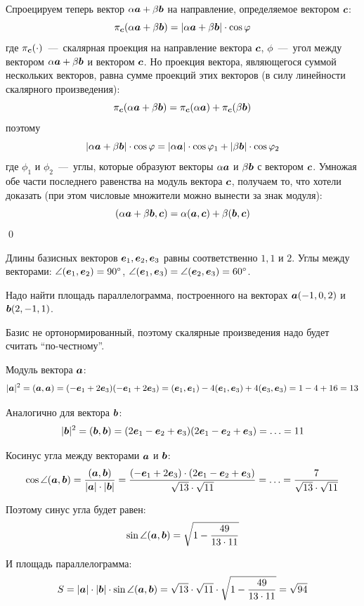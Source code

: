 \documentclass[a4paper,12pt]{article}
\begin{document}
  Спроецируем теперь вектор $\alpha \bds a \hm+ \beta \bds b$ на направление, определяемое вектором $\boldsymbol c$:
  \[
    \pi_{\boldsymbol c}(\alpha \boldsymbol a + \beta \boldsymbol b) = |\alpha \boldsymbol a + \beta \boldsymbol b| \cdot \cos \varphi
  \]
  где $\pi_{\boldsymbol c}(\cdot)$~---~скалярная проекция на направление вектора $\boldsymbol c$,
  $\phi$~---~угол между вектором $\alpha \bds a \hm+ \beta \bds b$ и вектором $\boldsymbol c$.
  Но проекция вектора, являющегося суммой нескольких векторов, равна сумме проекций этих векторов (в силу линейности скалярного произведения):
  \[
    \pi_{\boldsymbol c}(\alpha \boldsymbol a + \beta \boldsymbol b) = \pi_{\boldsymbol c}(\alpha \boldsymbol a) + \pi_{\boldsymbol c}(\beta \boldsymbol b)
  \]
  поэтому
  \[
    |\alpha \boldsymbol a + \beta \boldsymbol b| \cdot \cos \varphi = |\alpha \boldsymbol a| \cdot \cos \varphi_1 + |\beta \boldsymbol b| \cdot \cos \varphi_2
  \]
  где $\phi_1$ и $\phi_2$~---~углы, которые образуют векторы $\alpha \boldsymbol a$ и $\beta \boldsymbol b$ с вектором $\boldsymbol c$.
  Умножая обе части последнего равенства на модуль вектора $\boldsymbol c$, получаем то, что хотели доказать (при этом числовые множители можно вынести за знак модуля):
  \[
    (\alpha \boldsymbol a + \beta \boldsymbol b, \boldsymbol c) = \alpha (\boldsymbol a, \boldsymbol c) + \beta (\boldsymbol b, \boldsymbol c)
  \]
  \qed
  
  
  \begin{problem}[2.22]
    Длины базисных векторов $\boldsymbol e_1, \boldsymbol e_2, \boldsymbol e_3$ равны соответственно $1, 1$ и $2$.
    Углы между векторами: $\angle (\bds e_1, \bds e_2) \hm= 90\degree$, $\angle (\bds e_1, \bds e_3) \hm= \angle (\bds e_2, \bds e_3) \hm= 60\degree$.
    
    Надо найти площадь параллелограмма, построенного на векторах $\boldsymbol a (-1, 0, 2)$ и $\boldsymbol b (2, -1, 1)$.
  \end{problem}
  
  \begin{solution}
    Базис не ортонормированный, поэтому скалярные произведения надо будет считать ``по-честному''.
    
    Модуль вектора $\boldsymbol a$:
    \[
      |\boldsymbol a|^2 = (\boldsymbol a, \boldsymbol a) = (-\boldsymbol e_1 + 2\boldsymbol e_3)(-\boldsymbol e_1 + 2\boldsymbol e_3)
        = (\boldsymbol e_1, \boldsymbol e_1) - 4 (\boldsymbol e_1, \boldsymbol e_3) + 4 (\boldsymbol e_3, \boldsymbol e_3)
        = 1 - 4 + 16 = 13
    \]
    
    Аналогично для вектора $\boldsymbol b$:
    \[
      |\boldsymbol b|^2 = (\boldsymbol b, \boldsymbol b) = (2\boldsymbol e_1 - \boldsymbol e_2 + \boldsymbol e_3)(2\boldsymbol e_1 - \boldsymbol e_2 + \boldsymbol e_3)
        = \ldots = 11
    \]
    
    Косинус угла между векторами $\boldsymbol a$ и $\boldsymbol b$:
    \[
      \cos\angle(\boldsymbol a, \boldsymbol b) = \frac{(\boldsymbol a, \boldsymbol b)}{|\boldsymbol a| \cdot |\boldsymbol b|}
        = \frac{(-\boldsymbol e_1 + 2\boldsymbol e_3) \cdot (2\boldsymbol e_1 - \boldsymbol e_2 + \boldsymbol e_3)}{\sqrt{13} \cdot \sqrt{11}}
        = \ldots = \frac{7}{\sqrt{13} \cdot \sqrt{11}}
    \]
    
    Поэтому синус угла будет равен:
    \[
      \sin\angle(\boldsymbol a, \boldsymbol b) = \sqrt{1 - \frac{49}{13 \cdot 11}}
    \]
    
    И площадь параллелограмма:
    \[
      S = |\boldsymbol a| \cdot |\boldsymbol b| \cdot \sin\angle(\boldsymbol a, \boldsymbol b) = \sqrt{13} \cdot \sqrt{11} \cdot \sqrt{1 - \frac{49}{13 \cdot 11}} = \sqrt{94}
    \]
  \end{solution}
  
\end{document}
